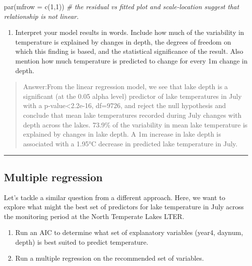 \documentclass[
]{article}
\newenvironment{Shaded}{\begin{snugshade}}{\end{snugshade}}
\newcommand{\AttributeTok}[1]{\textcolor[rgb]{0.77,0.63,0.00}{#1}}
\newcommand{\CommentTok}[1]{\textcolor[rgb]{0.56,0.35,0.01}{\textit{#1}}}
\newcommand{\DecValTok}[1]{\textcolor[rgb]{0.00,0.00,0.81}{#1}}
\newcommand{\FunctionTok}[1]{\textcolor[rgb]{0.00,0.00,0.00}{#1}}
\newcommand{\NormalTok}[1]{#1}
\providecommand{\tightlist}{%
  \setlength{\itemsep}{0pt}\setlength{\parskip}{0pt}}
\begin{document}
\begin{Shaded}
\begin{Highlighting}[]
\FunctionTok{par}\NormalTok{(}\AttributeTok{mfrow =} \FunctionTok{c}\NormalTok{(}\DecValTok{1}\NormalTok{,}\DecValTok{1}\NormalTok{))}
\CommentTok{\# the residual vs fitted plot and scale{-}location suggest that relationship is not linear. }
\end{Highlighting}
\end{Shaded}

\begin{enumerate}
\def\labelenumi{\arabic{enumi}.}
\setcounter{enumi}{7}
\tightlist
\item
  Interpret your model results in words. Include how much of the
  variability in temperature is explained by changes in depth, the
  degrees of freedom on which this finding is based, and the statistical
  significance of the result. Also mention how much temperature is
  predicted to change for every 1m change in depth.
\end{enumerate}

\begin{quote}
Answer:From the linear regression model, we see that lake depth is a
significant (at the 0.05 alpha level) predictor of lake temperatures in
July with a p-value\textless2.2e-16, df=9726, and reject the null
hypothesis and conclude that mean lake temperatures recorded during July
changes with depth across the lakes. 73.9\% of the variability in mean
lake temperature is explained by changes in lake depth. A 1m increase in
lake depth is associated with a 1.95°C decrease in predicted lake
temperature in July.
\end{quote}

\begin{center}\rule{0.5\linewidth}{0.5pt}\end{center}

\hypertarget{multiple-regression}{%
\subsection{Multiple regression}\label{multiple-regression}}

Let's tackle a similar question from a different approach. Here, we want
to explore what might the best set of predictors for lake temperature in
July across the monitoring period at the North Temperate Lakes LTER.

\begin{enumerate}
\def\labelenumi{\arabic{enumi}.}
\setcounter{enumi}{8}
\item
  Run an AIC to determine what set of explanatory variables (year4,
  daynum, depth) is best suited to predict temperature.
\item
  Run a multiple regression on the recommended set of variables.
\end{enumerate}
\end{document}
